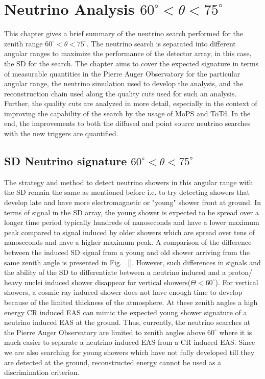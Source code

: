 
\chapter{Neutrino Analysis $60^\circ < \theta < 75^\circ$}
\label{sec:DGL}
This chapter gives a brief summary of the neutrino search performed for the zenith range $60^\circ < \theta < 75^\circ$. The neutrino search is separated into different angular ranges to maximize the performance of the detector array, in this case, the SD for the search. The chapter aims to cover the expected signature in terms of measurable quantities in the Pierre Auger Observatory for the particular angular range, the neutrino simulation used to develop the analysis, and the reconstruction chain used along the quality cuts used for such an analysis. Further, the quality cuts are analyzed in more detail, especially in the context of improving the capability of the search by the usage of MoPS and ToTd. In the end, the improvements to both the diffused and point source neutrino searches with the new triggers are quantified.


\section{SD Neutrino signature $60^{\circ} < \theta < 75^{\circ}$}
\label{sec:sig_DGL}

The strategy and method to detect neutrino showers in this angular range with the SD remain the same as mentioned before i.e. to try detecting showers that develop late and have more electromagnetic or "young" shower front at ground. In terms of signal in the SD array, the young shower is expected to be spread over a longer time period typically hundreds of nanoseconds and have a lower maximum peak compared to signal induced by older showers which are spread over tens of nanoseconds and have a higher maximum peak. A comparison of the difference between the induced SD signal from a young and old shower arriving from the same zenith angle is presented in Fig. ~\ref{}. However, such differences in signals and the ability of the SD to differentiate between a neutrino induced and a proton/ heavy nuclei induced shower disappear for vertical showers($\Theta < 60^{\circ}$). For vertical showers, a cosmic ray induced shower does not have enough time to develop because of the limited thickness of the atmosphere. At these zenith angles a high energy CR induced EAS can mimic the expected young shower signature of a neutrino induced EAS at the ground. Thus, currently, the neutrino searches at the Pierre Auger Observatory are limited to zenith angles above $60^\circ$ where it is much easier to separate a neutrino induced EAS from a CR induced EAS. Since we are also searching for young showers which have not fully developed till they are detected at the ground, reconstructed energy cannot be used as a discrimination criterion.      

